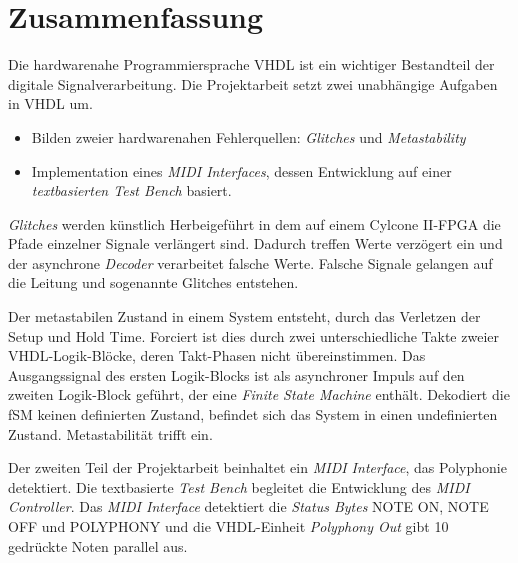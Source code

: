 
\chapter*{Zusammenfassung}


Die hardwarenahe Programmiersprache VHDL ist ein wichtiger Bestandteil der digitale Signalverarbeitung. Die Projektarbeit setzt zwei unabhängige Aufgaben in VHDL um.

\begin{itemize}
\item Bilden zweier hardwarenahen Fehlerquellen: \textit{Glitches} und \textit{Metastability}
	\item Implementation eines \textit{MIDI Interfaces}, dessen Entwicklung auf einer \textit{textbasierten Test Bench} basiert.
\end{itemize} 

\textit{Glitches} werden künstlich Herbeigeführt in dem auf einem Cylcone II-FPGA die Pfade einzelner Signale verlängert sind. Dadurch treffen Werte verzögert ein und der asynchrone \textit{Decoder} verarbeitet falsche Werte. Falsche Signale gelangen auf die Leitung und sogenannte Glitches entstehen. 

Der metastabilen Zustand in einem System entsteht, durch das Verletzen der Setup und Hold Time. Forciert ist dies durch zwei unterschiedliche Takte zweier VHDL-Logik-Blöcke, deren Takt-Phasen nicht übereinstimmen. Das Ausgangssignal des ersten Logik-Blocks ist als asynchroner Impuls auf den zweiten Logik-Block geführt, der eine \textit{Finite State Machine} enthält. Dekodiert die fSM keinen definierten Zustand, befindet sich das System in einen undefinierten Zustand. Metastabilität trifft ein.

Der zweiten Teil der Projektarbeit beinhaltet ein \textit{MIDI Interface}, das Polyphonie detektiert. Die textbasierte \textit{Test Bench} begleitet die Entwicklung des \textit{MIDI Controller}. Das \textit{MIDI Interface} detektiert die \textit{Status Bytes} NOTE ON, NOTE OFF und POLYPHONY und die VHDL-Einheit \textit{Polyphony Out} gibt 10 gedrückte Noten parallel aus.

